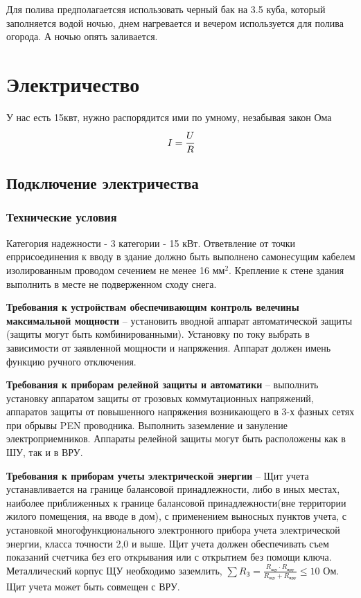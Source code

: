\documentclass[10pt, twocolumn]{report}
\begin{document}
Для полива предполагаетсяя использовать черный бак на 3.5 куба, который заполняется водой ночью, днем нагревается и вечером используется для полива огорода. А ночью опять заливается.

\chapter{Электричество}
У нас есть 15квт, нужно распорядится ими по умному, незабывая закон Ома $$ I = \cfrac{U}{R} $$

\section{Подключение электричества}

\subsection{Технические условия}

Категория надежности - 3 категории - 15 кВт.
Ответвление от точки епррисоединения к вводу в здание должно быть выполнено самонесущим кабелем изолированным проводом сечением не менее 16 $\text{мм}^2$. Крепление к стене здания выполнить в месте не подверженном сходу снега.

\textbf{Требования к устройствам обеспечивающим контроль велечины максимальной мощности} -- установить вводной аппарат автоматической защиты (защиты могут быть комбинированными). Установку по току выбрать в зависимости от заявленной мощности и напряжения. Аппарат должен имень функцию ручного отключения. 

\textbf{Требования к приборам релейной защиты и автоматики} -- выполнить установку аппаратом защиты от грозовых коммутационных напряжений, аппаратов защиты от повышенного напряжения возникающего в 3-х фазных сетях при обрывы PEN проводника. Выполнить заземление и зануление электроприемников. Аппараты релейной защиты могут быть расположены как в ШУ, так и в ВРУ.

\textbf{Требования к приборам учеты электрической энергии} -- Щит учета устанавливается на границе балансовой принадлежности, либо в иных местах, наиболее приближенных к границе балансовой принадлежности(вне территории жилого помещения, на вводе в дом), с применением выносных пунктов учета, с установкой многофункционального электронного прибора учета электрической энергии, класса точности 2,0 и выше. Щит учета должен обеспечивать съем показаний счетчика без его открывания или с открытием без помощи ключа. Металлический корпус ЩУ необходимо заземлить, $\sum{R_{\text{З}}} = \frac{R_{\text{щу}} \cdot R_{\text{вру}}}{R_{\text{щу}} + R_{\text{вру}}} \le 10 \text{ Ом}$. Щит учета может быть совмещен с ВРУ.
\end{document}
